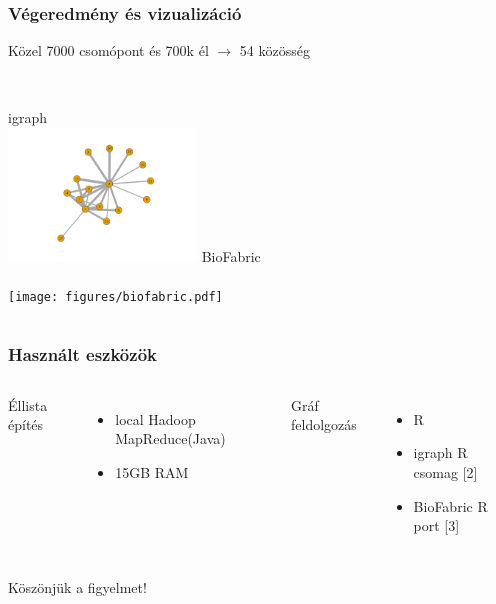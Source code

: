 \documentclass{beamer}
\begin{document}
\begin{frame}
\frametitle{Végeredmény és vizualizáció}
Közel 7000 csomópont és 700k él  $\rightarrow$ 54 közösség\\~\\
\begin{columns}[t]
	
		\centering
		igraph \\
		\includegraphics[width = 5cm, trim = 7.5cm 1cm 5.5cm 1cm, clip]{figures/groups.pdf}
		\centering
		BioFabric \\~\\
		\texttt{[image: figures/biofabric.pdf]}
\end{columns}
\end{frame}

\begin{frame}
\frametitle{Használt eszközök} %
\begin{columns}[t]
		Éllista építés
      \begin{itemize}
        \item local Hadoop MapReduce(Java)
        \item 15GB RAM
      \end{itemize}
		Gráf feldolgozás
      \begin{itemize}
		\item R
        \item igraph R csomag [2]
		\item BioFabric R port [3]
      \end{itemize}
\end{columns}
\end{frame}


\begin{frame}[plain]
\Huge{\centerline{Köszönjük a figyelmet!}}
\end{frame}
\end{document}
